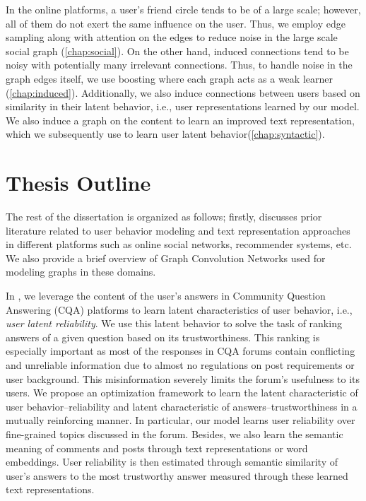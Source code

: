 In the online platforms, a user's friend circle tends to be of a large scale; however, all of them do not exert the same influence on the user. Thus, we employ edge sampling along with attention on the edges to reduce noise in the large scale social graph (\cref{chap:social}). On the other hand, induced connections tend to be noisy with potentially many irrelevant connections. Thus, to handle noise in the graph edges itself, we use boosting where each graph acts as a weak learner (\cref{chap:induced}).
Additionally, %
we also induce connections between users based on similarity in their latent behavior, i.e., user representations learned by our model. We also induce a graph on the content to learn an improved text representation, which we subsequently use to learn user latent behavior(\cref{chap:syntactic}).


\noindent
\section{Thesis Outline}
The rest of the dissertation is organized as follows;
firstly,  discusses prior literature related to user behavior modeling and text representation approaches in different platforms such as online social networks, recommender systems, etc. %
We also provide a brief overview of Graph Convolution Networks used for modeling graphs in these domains.

In , we leverage the content of the user's answers in Community Question Answering (CQA) platforms to learn latent characteristics of user behavior, i.e., \emph{user latent reliability}. We use this latent behavior to solve the task of ranking answers of a given question based on its trustworthiness. This ranking is especially important as most of the responses in CQA forums contain conflicting and unreliable information due to almost no regulations on post requirements or user background. This misinformation severely limits the forum's usefulness to its users.
We propose an optimization framework to learn the latent characteristic of user behavior--reliability and latent characteristic of answers--trustworthiness in a mutually reinforcing manner.
In particular, our model learns user reliability over fine-grained topics discussed in the forum. Besides, we also learn the semantic meaning of comments and posts through text representations or word embeddings.
User reliability is then estimated through semantic similarity of user's answers to the most trustworthy answer measured through these learned text representations.


